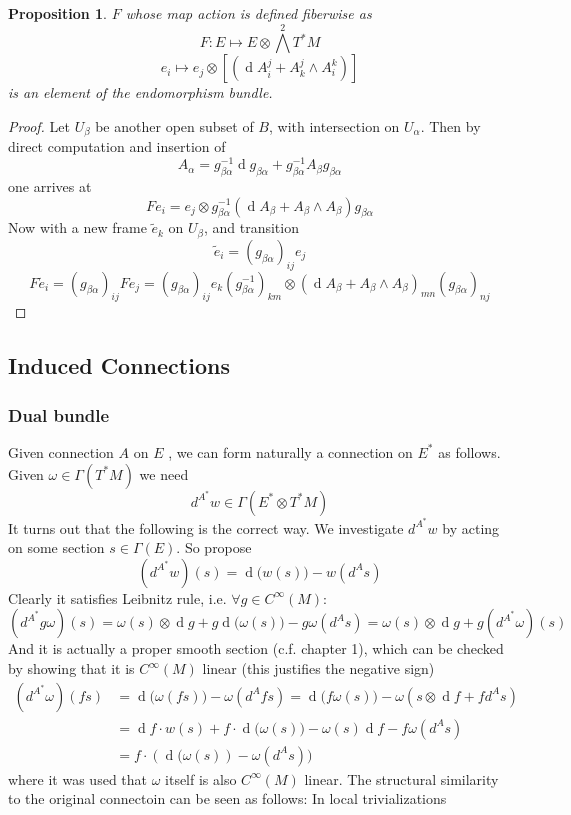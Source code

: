 \documentclass{article}
\numberwithin{theorem}{section}
\newtheorem{proposition}[theorem]{Proposition}
\renewcommand{\d}[1]{\ensuremath{\operatorname{d}\!{#1}}}
\newcommand{\1}{\mathds{1}}
\begin{document}
\begin{proposition}
    $F$ whose map action is defined fiberwise as 
    \[ F : E \mapsto E \otimes \bigwedge  ^2 T^*M \]
    \[ e_i \mapsto e_j \otimes \left[ (\d A^j_i + A^j_k \wedge A^k_i) \right] \]
    is an element of the endomorphism bundle. 
\end{proposition}
\begin{proof}
    Let $U_\beta$ be another open subset of $B$, with intersection on $U_\alpha$. 
    Then by direct computation and insertion of  
    \[ A_\alpha = g^{-1}_{\beta \alpha}\d g_{\beta \alpha} + g^{-1}_{\beta \alpha}A_\beta g_{\beta \alpha}\]
    one arrives at 
    \[ Fe_i = e_j \otimes g^{-1}_{\beta \alpha}\left(\d A_\beta + A_\beta \wedge A_\beta\right) g_{\beta \alpha}\]
    Now with a new frame $\tilde{e}_k$ on $U_\beta$, and transition 
    \[ \tilde{e}_i = (g_{\beta \alpha})_{ij} e_j \]
    \[ F\tilde{e}_i = (g_{\beta \alpha})_{ij}Fe_j =(g_{\beta \alpha})_{ij} e_k (g_{\beta \alpha}^{-1})_{km}\otimes (\d A_\beta + A_\beta \wedge A_\beta)_{mn}(g_{\beta \alpha})_{nj} \]

\end{proof}

\subsection{Induced Connections}
\subsubsection{Dual bundle}
Given connection $A$ on $E$ , we can form naturally a connection on $E^*$ as follows. Given $\omega \in \Gamma(T^*M)$ we need 
\[ d^{A^*}w \in \Gamma(E^* \otimes T^*M) \]
It turns out that the following is the correct way. We investigate $d^{A^*}w$ by acting on some section $s \in \Gamma(E)$. So propose
\[ (d^{A^*}w)(s) = \d(w(s)) - w(d^{A}s)\]
Clearly it satisfies Leibnitz rule, i.e. $\forall g \in C^\infty(M)$: 
\[ (d^{A^*}g\omega)(s)= \omega(s)\otimes \d g + g \d(\omega(s)) - g \omega(d^A s) = \omega(s) \otimes \d g + g(d^{A^*}\omega)(s)\]
And it is actually a proper smooth section (c.f. chapter 1), which can be checked by showing that it is $C^\infty(M)$ linear (this justifies the negative sign)
\begin{align*}
    (d^{A^*}\omega)(fs) &= \d(\omega(fs)) - \omega(d^Afs) = \d(f\omega(s)) - \omega(s \otimes \d f + f d^A s)  \\
    &= \d f \cdot w(s) + f \cdot \d(\omega(s))- \omega(s) \d f - f \omega(d^A s) \\ 
    &= f \cdot (\d(\omega(s)) - \omega(d^A s))
\end{align*}
where it was used that $\omega$ itself is also $C^\infty(M)$ linear. The structural similarity to the original connectoin can be seen as follows: In local trivializations 
\end{document}
